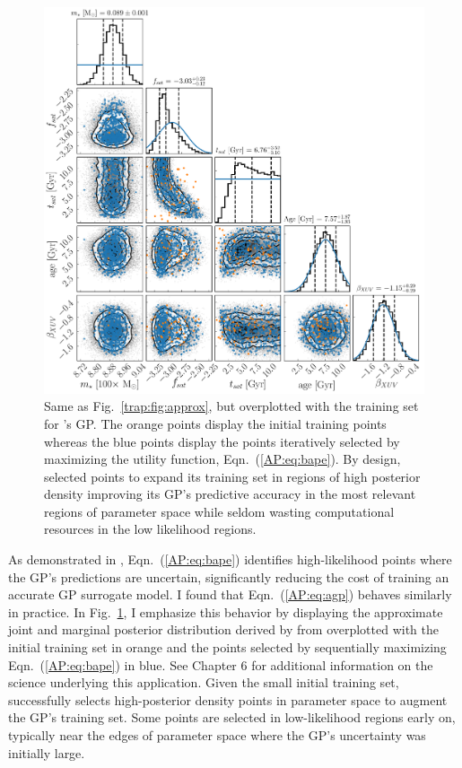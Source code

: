 \begin{figure}
	\includegraphics[width=\textwidth]{points.pdf}
   \caption{Same as Fig.~\ref{trap:fig:approx}, but overplotted with the training set for \approxposterior's GP. The orange points display the initial training points whereas the blue points display the points iteratively selected by maximizing the \citet{Kandasamy2017} utility function, Eqn.~(\ref{AP:eq:bape}). By design, \approxposterior selected points to expand its training set in regions of high posterior density improving its GP's predictive accuracy in the most relevant regions of parameter space while seldom wasting computational resources in the low likelihood regions.}%
    \label{AP:fig:points}%
\end{figure}

As demonstrated in \citet{Kandasamy2017}, Eqn.~(\ref{AP:eq:bape}) identifies high-likelihood points where the GP's predictions are uncertain, significantly reducing the cost of training an accurate GP surrogate model. I found that Eqn.~(\ref{AP:eq:agp}) behaves similarly in practice. In Fig.~\ref{AP:fig:points}, I emphasize this behavior by displaying the approximate joint and marginal posterior distribution derived by \approxposterior from \citet{Fleming2020} overplotted with the initial training set in orange and the points selected by sequentially maximizing Eqn.~(\ref{AP:eq:bape}) in blue. See Chapter 6 for additional information on the science underlying this application. Given the small initial training set, \approxposterior successfully selects high-posterior density points in parameter space to augment the GP's training set. Some points are selected in low-likelihood regions early on, typically near the edges of parameter space where the GP's uncertainty was initially large.

